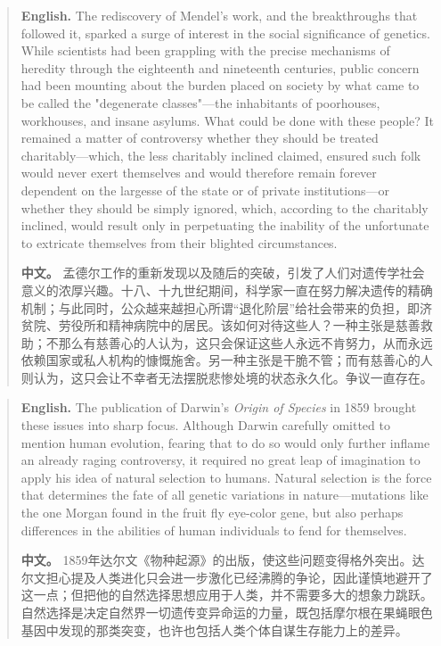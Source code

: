 \begin{quote}
\noindent\textbf{English.} The rediscovery of Mendel's work, and the breakthroughs that followed it, sparked a surge of interest in the social significance of genetics. While scientists had been grappling with the precise mechanisms of heredity through the eighteenth and nineteenth centuries, public concern had been mounting about the burden placed on society by what came to be called the "degenerate classes"---the inhabitants of poorhouses, workhouses, and insane asylums. What could be done with these people? It remained a matter of controversy whether they should be treated charitably---which, the less charitably inclined claimed, ensured such folk would never exert themselves and would therefore remain forever dependent on the largesse of the state or of private institutions---or whether they should be simply ignored, which, according to the charitably inclined, would result only in perpetuating the inability of the unfortunate to extricate themselves from their blighted circumstances.

\smallskip
\noindent\textbf{中文。} 孟德尔工作的重新发现以及随后的突破，引发了人们对遗传学社会意义的浓厚兴趣。十八、十九世纪期间，科学家一直在努力解决遗传的精确机制；与此同时，公众越来越担心所谓“退化阶层”给社会带来的负担，即济贫院、劳役所和精神病院中的居民。该如何对待这些人？一种主张是慈善救助；不那么有慈善心的人认为，这只会保证这些人永远不肯努力，从而永远依赖国家或私人机构的慷慨施舍。另一种主张是干脆不管；而有慈善心的人则认为，这只会让不幸者无法摆脱悲惨处境的状态永久化。争议一直存在。
\end{quote}

\begin{quote}
\noindent\textbf{English.} The publication of Darwin's \emph{Origin of Species} in 1859 brought these issues into sharp focus. Although Darwin carefully omitted to mention human evolution, fearing that to do so would only further inflame an already raging controversy, it required no great leap of imagination to apply his idea of natural selection to humans. Natural selection is the force that determines the fate of all genetic variations in nature---mutations like the one Morgan found in the fruit fly eye-color gene, but also perhaps differences in the abilities of human individuals to fend for themselves.

\smallskip
\noindent\textbf{中文。} 1859年达尔文《物种起源》的出版，使这些问题变得格外突出。达尔文担心提及人类进化只会进一步激化已经沸腾的争论，因此谨慎地避开了这一点；但把他的自然选择思想应用于人类，并不需要多大的想象力跳跃。自然选择是决定自然界一切遗传变异命运的力量，既包括摩尔根在果蝇眼色基因中发现的那类突变，也许也包括人类个体自谋生存能力上的差异。
\end{quote}

